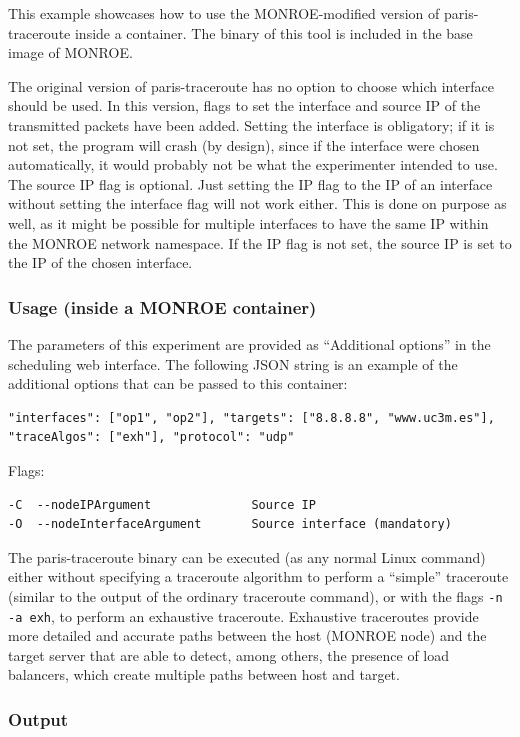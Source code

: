 \documentclass[a4paper,10pt]{article}
\newcommand{\monroe}{MONROE}
\newcommand{\identifier}[1]{{\texttt{\small{#1}}}}
\begin{document}
This example showcases how to use the \monroe{}-modified version of paris-traceroute inside a container.
The binary of this tool is included in the base image of \monroe{}.

The original version of paris-traceroute has no option to choose which interface should be used.
In this version, flags to set the interface and source IP of the transmitted packets have been added.
Setting the interface is obligatory; if it is not set, the program will crash (by design), since if the interface were chosen automatically, it would probably not be what the experimenter intended to use.
The source IP flag is optional.
Just setting the IP flag to the IP of an interface without setting the interface flag will not work either.
This is done on purpose as well, as it might be possible for multiple interfaces to have the same IP within the \monroe{} network namespace.
If the IP flag is not set, the source IP is set to the IP of the chosen interface.

\subsubsection{Usage (inside a \monroe{} container)}

The parameters of this experiment are provided as ``Additional options'' in the scheduling web interface.
The following JSON string is an example of the additional options that can be passed to this container:
\begin{verbatim}
"interfaces": ["op1", "op2"], "targets": ["8.8.8.8", "www.uc3m.es"],
"traceAlgos": ["exh"], "protocol": "udp"
\end{verbatim}

Flags:
\begin{verbatim}
-C  --nodeIPArgument              Source IP
-O  --nodeInterfaceArgument       Source interface (mandatory)
\end{verbatim}

The paris-traceroute binary can be executed (as any normal Linux command) either without specifying a traceroute algorithm to perform a ``simple'' traceroute (similar to the output of the ordinary traceroute command), or with the flags \identifier{-n -a exh}, to perform an exhaustive traceroute.
Exhaustive traceroutes provide more detailed and accurate paths between the host (\monroe{} node) and the target server that are able to detect, among others, the presence of load balancers, which create multiple paths between host and target.

\subsubsection{Output}
\end{document}
